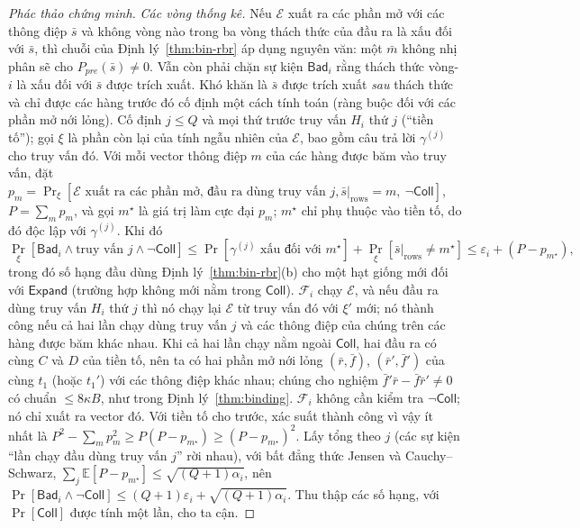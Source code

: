 \begin{proof}[Phác thảo chứng minh]
\emph{Các vòng thống kê.} Nếu $\mathcal E$ xuất ra các phần mở với các thông
điệp $\bar s$ và không vòng nào trong ba vòng thách thức của đầu ra là xấu đối
với $\bar s$, thì chuỗi của Định lý~\ref{thm:bin-rbr} áp dụng nguyên văn: một
$\bar m$ không nhị phân sẽ cho $P_{\mathit{pre}}(\bar s)\ne0$. Vẫn còn phải
chặn sự kiện $\mathsf{Bad}_i$ rằng thách thức vòng-$i$ là xấu đối với $\bar s$
được trích xuất. Khó khăn là $\bar s$ được trích xuất \emph{sau} thách thức và
chỉ được các hàng trước đó cố định một cách tính toán (ràng buộc đối với các
phần mở nới lỏng). Cố định $j\le Q$ và mọi thứ trước truy vấn $H_i$ thứ $j$
(``tiền tố''); gọi $\xi$ là phần còn lại của tính ngẫu nhiên của
$\mathcal E$, bao gồm câu trả lời $\gamma^{(j)}$ cho truy vấn đó. Với mỗi
vector thông điệp $m$ của các hàng được băm vào truy vấn, đặt
$p_m=\Pr_\xi[\mathcal E \text{ xuất ra các phần mở, đầu ra dùng truy vấn }j,
\bar s|_{\mathrm{rows}}=m,\ \neg\mathsf{Coll}]$, $P=\sum_mp_m$, và gọi $m^\star$
là giá trị làm cực đại $p_m$; $m^\star$ chỉ phụ thuộc vào tiền tố, do đó độc
lập với $\gamma^{(j)}$. Khi đó
\[
\Pr_\xi[\mathsf{Bad}_i\wedge\text{truy vấn }j\wedge\neg\mathsf{Coll}]
\le\Pr[\gamma^{(j)}\text{ xấu đối với }m^\star]+\Pr_\xi[\bar s|_{\mathrm{rows}}\ne m^\star]
\le\varepsilon_i+(P-p_{m^\star}),
\]
trong đó số hạng đầu dùng Định lý~\ref{thm:bin-rbr}(b) cho một hạt giống mới
đối với $\mathsf{Expand}$ (trường hợp không mới nằm trong $\mathsf{Coll}$).
$\mathcal F_i$ chạy $\mathcal E$, và nếu đầu ra dùng truy vấn $H_i$ thứ $j$ thì
nó chạy lại $\mathcal E$ từ truy vấn đó với $\xi'$ mới; nó thành công nếu cả
hai lần chạy dùng truy vấn $j$ và các thông điệp của chúng trên các hàng được
băm khác nhau. Khi cả hai lần chạy nằm ngoài $\mathsf{Coll}$, hai đầu ra có cùng
$C$ và $D$ của tiền tố, nên ta có hai phần mở nới lỏng $(\bar r,\bar f)$,
$(\bar r',\bar f')$ của
cùng $t_1$ (hoặc $t_1'$) với các thông điệp khác nhau; chúng cho nghiệm \MSIS{}
$\bar f'\bar r-\bar f\bar r'\ne0$ có chuẩn $\le8\kappa B$, như trong
Định lý~\ref{thm:binding}. $\mathcal F_i$ không cần kiểm tra $\neg\mathsf{Coll}$;
nó chỉ xuất ra vector đó. Với tiền tố cho trước, xác suất thành công vì vậy ít
nhất là $P^2-\sum_mp_m^2\ge P(P-p_{m^\star})\ge(P-p_{m^\star})^2$. Lấy tổng
theo $j$ (các sự kiện ``lần chạy đầu dùng truy vấn $j$'' rời nhau), với bất
đẳng thức Jensen và Cauchy--Schwarz,
$\sum_j\mathbb E[P-p_{m^\star}]\le\sqrt{(Q+1)\alpha_i}$, nên
$\Pr[\mathsf{Bad}_i\wedge\neg\mathsf{Coll}]\le(Q+1)\varepsilon_i+\sqrt{(Q+1)\alpha_i}$.
Thu thập các số hạng, với $\Pr[\mathsf{Coll}]$ được tính một lần, cho ta cận.


\end{proof}
